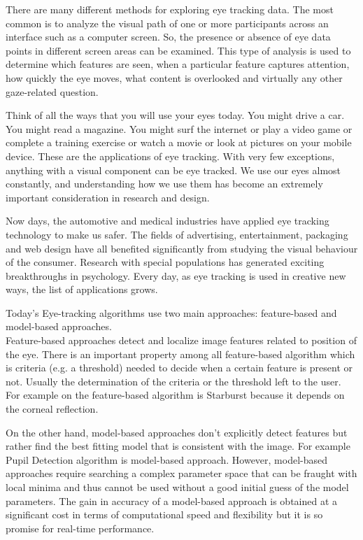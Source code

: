 There are many different methods for exploring eye tracking data. The most common is to analyze the visual path of one or more participants across an interface such as a computer screen. So, the presence or absence of eye data points in different screen areas can be examined. This type of analysis is used to determine which features are seen, when a particular feature captures attention, how quickly the eye moves, what content is overlooked and virtually any other gaze-related question. \bigskip

Think of all the ways that you will use your eyes today. You might drive a car. You might read a magazine. You might surf the internet or play a video game or complete a training exercise or watch a movie or look at pictures on your mobile device. These are the applications of eye tracking. With very few exceptions, anything with a visual component can be eye tracked. We use our eyes almost constantly, and understanding how we use them has become an extremely important consideration in research and design. \bigskip

Now days, the automotive and medical industries have applied eye tracking technology to make us safer. The fields of advertising, entertainment, packaging and web design have all benefited significantly from studying the visual behaviour of the consumer. Research with special populations has generated exciting breakthroughs in psychology. Every day, as eye tracking is used in creative new ways, the list of applications grows. \bigskip

Today's Eye-tracking algorithms use two main approaches: feature-based and model-based approaches. \bigskip \\
Feature-based approaches detect and localize image features related to position of the eye. There is an important property among all feature-based algorithm which is criteria (e.g. a threshold) needed to decide when a certain feature is present or not. Usually the determination of the criteria or the threshold left to the user. For example on the feature-based algorithm is Starburst because it depends on the corneal reflection. \bigskip \cite{starburst}

On the other hand, model-based approaches don't explicitly detect features but rather find the best fitting model that is consistent with the image. For example Pupil Detection algorithm is model-based approach. However, model-based approaches require searching a complex parameter space that can be fraught with local minima and thus cannot be used without a good initial guess of the model parameters. The gain in accuracy of a model-based approach is obtained at a significant cost in terms of computational speed and flexibility but it is so promise for real-time performance. \bigskip \cite{starburst}

